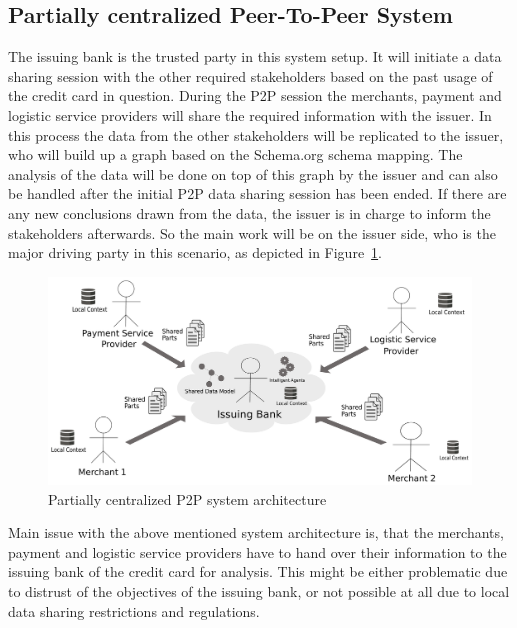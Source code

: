 \subsection{Partially centralized Peer-To-Peer System}
\label{subsec:p2p_partially_centralized_system}

The issuing bank is the trusted party in this system setup. It will initiate a data sharing session with the other required stakeholders based on the past usage of the credit card in question. During the P2P session the merchants, payment and logistic service providers will share the required information with the issuer. In this process the data from the other stakeholders will be replicated to the issuer, who will build up a graph based on the Schema.org schema mapping. The analysis of the data will be done on top of this graph by the issuer and can also be handled after the initial P2P data sharing session has been ended. If there are any new conclusions drawn from the data, the issuer is in charge to inform the stakeholders afterwards. So the main work will be on the issuer side, who is the major driving party in this scenario, as depicted in Figure~\ref{fig:images_p2p_centralized}.\@

\begin{figure}[H]
	\centering
		\includegraphics[width=0.8\columnwidth]{images/system_P2P_centralized.pdf}
	\caption{Partially centralized P2P system architecture}
\label{fig:images_p2p_centralized}
\end{figure}

Main issue with the above mentioned system architecture is, that the merchants, payment and logistic service providers have to hand over their information to the issuing bank of the credit card for analysis. This might be either problematic due to distrust of the objectives of the issuing bank, or not possible at all due to local data sharing restrictions and regulations.


